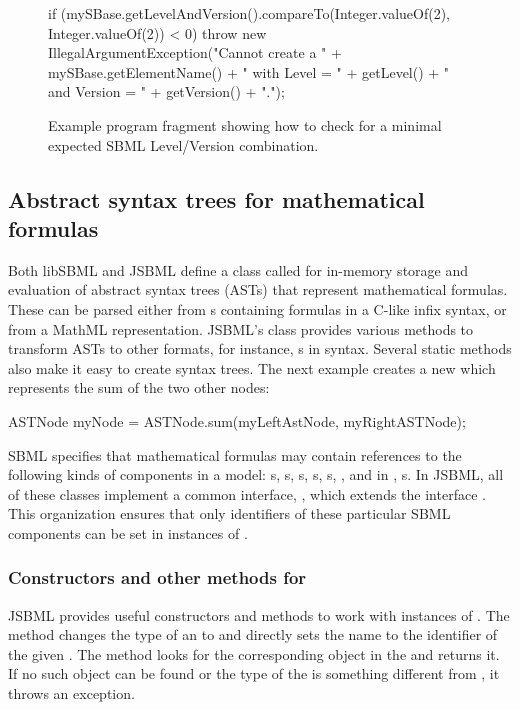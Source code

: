 \begin{figure}[bh]%
  \begin{example}
if (mySBase.getLevelAndVersion().compareTo(Integer.valueOf(2), Integer.valueOf(2)) < 0) {
  throw new IllegalArgumentException("Cannot create a " + mySBase.getElementName() + 
  		" with Level = " + getLevel() + " and Version = " + getVersion() + ".");
}\end{example}
  \caption{Example program fragment showing how to check for a minimal
    expected SBML Level/Version combination.}
  \label{fig:LevelVersionCheck}
\end{figure}


\subsection{Abstract syntax trees for mathematical formulas}

Both libSBML and JSBML define a class called \ASTNode for in-memory storage
and evaluation of abstract syntax trees (ASTs) that represent mathematical
formulas. These can be parsed either from \String{}s containing formulas in a
C-like infix syntax, or from a MathML  representation.  JSBML's
\ASTNode class provides various methods to transform ASTs to other formats,
for instance, s in \latex syntax.  Several static methods also
make it easy to create syntax trees.  The next example creates a new
\ASTNode which represents the sum of the two other nodes:

\begin{example}
ASTNode myNode = ASTNode.sum(myLeftAstNode, myRightASTNode);
\end{example}

SBML specifies that mathematical formulas may contain references to the
following kinds of components in a model: \Parameter{}s,
\LocalParameter{}s, \FunctionDefinition{}s, \Reaction{}s, \Compartment{}s,
\Species, and in \SBMLthree, \SpeciesReference{}s.  In JSBML, all of these
classes implement a common interface, \CallableSBase, which extends
the interface \NamedSBaseWithDerivedUnit. This organization ensures that
only identifiers of these particular SBML components can be set in
instances of \ASTNode.


\subsubsection{Constructors and other methods for \CallableSBase}

JSBML provides useful constructors and methods to work with instances of
\CallableSBase.  The  method changes the type of an \ASTNode to
\ASTTypeName and directly sets the name to the identifier of the given
\CallableSBase.  The  method looks for the corresponding object in
the \Model and returns it. If no such object can be found or the type of the
\ASTNode is something different from \ASTTypeName, it throws an exception.

